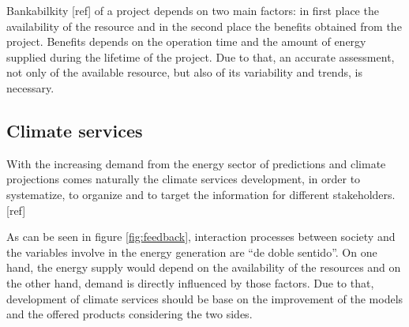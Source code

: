 Bankabilkity [ref] of a project depends on two main factors: in first place the availability of the resource and in the second place the benefits obtained from the project. Benefits depends on the operation time and the amount of energy supplied during the lifetime of the project. Due to that, an accurate assessment, not only of the available resource, but also of its variability and trends, is necessary. 


\subsection{Climate services}


With the increasing demand from the energy sector of predictions and climate projections comes naturally the climate services development, in order to systematize, to organize and to target the information for different stakeholders. [ref]


As can be seen in figure \ref{fig:feedback}, interaction processes between society and the variables involve in the energy generation are ``de doble sentido''. On one hand, the energy supply would depend on the availability of the resources and on the other hand, demand is directly influenced by those factors. Due to that, development of climate services should be base on the improvement of the models and the offered products considering the two sides.   


